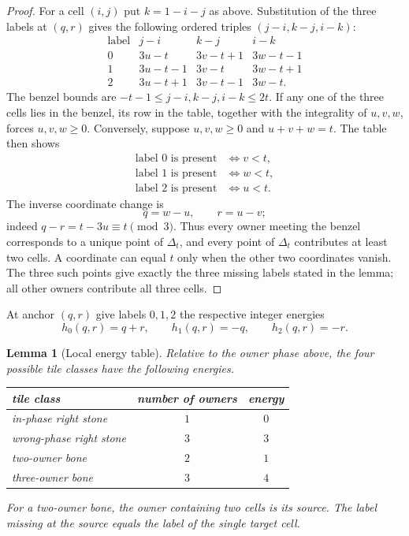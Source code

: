 \documentclass[11pt]{amsart}
\newtheorem{lemma}[theorem]{Lemma}
\theoremstyle{definition}
\begin{document}
\begin{proof}
For a cell $(i,j)$ put $k=1-i-j$ as above.  Substitution of the three labels
at $(q,r)$ gives the following ordered triples
$(j-i,k-j,i-k)$:
\[
\begin{array}{c|ccc}
\text{label}&j-i&k-j&i-k\\ \hline
0&3u-t&3v-t+1&3w-t-1\\
1&3u-t-1&3v-t&3w-t+1\\
2&3u-t+1&3v-t-1&3w-t.
\end{array}
\]
The benzel bounds are $-t-1\leq j-i,k-j,i-k\leq2t$.  If any one of the
three cells lies in the benzel, its row in the table, together with the
integrality of $u,v,w$, forces $u,v,w\geq0$.  Conversely, suppose
$u,v,w\geq0$ and $u+v+w=t$.  The table then shows
\begin{align*}
 \text{label }0\text{ is present}&\iff v<t,\\
 \text{label }1\text{ is present}&\iff w<t,\\
 \text{label }2\text{ is present}&\iff u<t.
\end{align*}
The inverse coordinate change is
\[
 q=w-u,\qquad r=u-v;
\]
indeed $q-r=t-3u\equiv t\pmod3$.  Thus every owner meeting the benzel
corresponds to a unique point of $\Delta_t$, and every point of $\Delta_t$
contributes at least two cells.
A coordinate can equal $t$ only when the other two coordinates vanish.  The
three such points give exactly the three missing labels stated in the lemma;
all other owners contribute all three cells.
\end{proof}

At anchor $(q,r)$ give labels $0,1,2$ the respective integer energies
\begin{equation}\label{eq:cell-energy}
 h_0(q,r)=q+r,\qquad h_1(q,r)=-q,\qquad h_2(q,r)=-r.
\end{equation}

\begin{lemma}[Local energy table]\label{lem:energy-table}
Relative to the owner phase above, the four possible tile classes have the
following energies.
\begin{center}
\begin{tabular}{lcc}
\toprule
tile class & number of owners & energy\\
\midrule
in-phase right stone & $1$ & $0$\\
wrong-phase right stone & $3$ & $3$\\
two-owner bone & $2$ & $1$\\
three-owner bone & $3$ & $4$\\
\bottomrule
\end{tabular}
\end{center}
For a two-owner bone, the owner containing two cells is its source.  The label
missing at the source equals the label of the single target cell.
\end{lemma}
\end{document}
